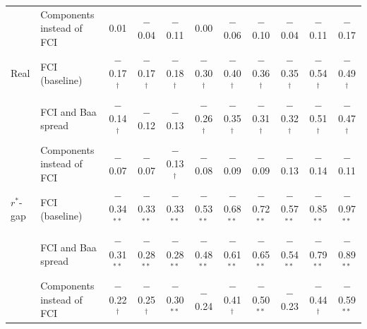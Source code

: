 \begin{tabular}{llccccccccc}
 & Components instead of FCI & 0.01 & $-$0.04 & $-$0.11 & 0.00 & $-$0.06 & $-$0.10 & $-$0.04 & $-$0.11 & $-$0.17 \\
Real & FCI (baseline) & $-$0.17$^{\dagger}$ & $-$0.17$^{\dagger}$ & $-$0.18$^{\dagger}$ & $-$0.30$^{\dagger}$ & $-$0.40$^{\dagger}$ & $-$0.36$^{\dagger}$ & $-$0.35$^{\dagger}$ & $-$0.54$^{\dagger}$ & $-$0.49$^{\dagger}$ \\
 & FCI and Baa spread & $-$0.14$^{\dagger}$ & $-$0.12 & $-$0.13 & $-$0.26$^{\dagger}$ & $-$0.35$^{\dagger}$ & $-$0.31$^{\dagger}$ & $-$0.32$^{\dagger}$ & $-$0.51$^{\dagger}$ & $-$0.47$^{\dagger}$ \\
 & Components instead of FCI & $-$0.07 & $-$0.07 & $-$0.13$^{\dagger}$ & $-$0.08 & $-$0.09 & $-$0.09 & $-$0.13 & $-$0.14 & $-$0.11 \\
$r^*$-gap & FCI (baseline) & $-$0.34$^{**}$ & $-$0.33$^{**}$ & $-$0.33$^{**}$ & $-$0.53$^{**}$ & $-$0.68$^{**}$ & $-$0.72$^{**}$ & $-$0.57$^{**}$ & $-$0.85$^{**}$ & $-$0.97$^{**}$ \\
 & FCI and Baa spread & $-$0.31$^{**}$ & $-$0.28$^{**}$ & $-$0.28$^{**}$ & $-$0.48$^{**}$ & $-$0.61$^{**}$ & $-$0.65$^{**}$ & $-$0.54$^{**}$ & $-$0.79$^{**}$ & $-$0.89$^{**}$ \\
 & Components instead of FCI & $-$0.22$^{\dagger}$ & $-$0.25$^{\dagger}$ & $-$0.30$^{**}$ & $-$0.24 & $-$0.41$^{\dagger}$ & $-$0.50$^{**}$ & $-$0.23 & $-$0.44$^{\dagger}$ & $-$0.59$^{**}$ \\
\bottomrule
\end{tabular}
